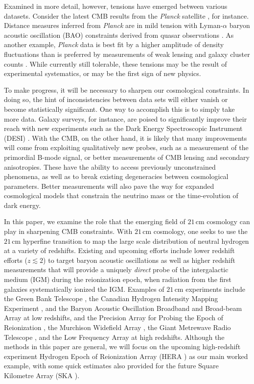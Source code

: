\documentclass[twocolumn,aps,prd,nofootinbib,showpacs,superscriptaddress]{revtex4-1}
\begin{document}
Examined in more detail, however, tensions have emerged between various datasets. Consider the latest CMB results from the \emph{Planck} satellite \cite{Planck2015overview}, for instance. Distance measures inferred from \emph{Planck} are in mild tension with Lyman-$\alpha$ baryon acoustic oscillation (BAO) constraints derived from quasar observations \cite{Planck2015parameters}. As another example, \emph{Planck} data is best fit by a higher amplitude of density fluctuations than is preferred by measurements of weak lensing and galaxy cluster counts \cite{Planck2015clusters}. While currently still tolerable, these tensions may be the result of experimental systematics, or may be the first sign of new physics.

To make progress, it will be necessary to sharpen our cosmological constraints. In doing so, the hint of inconsistencies between data sets will either vanish or become statistically significant. One way to accomplish this is to simply take more data. Galaxy surveys, for instance, are poised to significantly improve their reach with new experiments such as the Dark Energy Spectroscopic Instrument (DESI) \cite{levi_et_al2013}. With the CMB, on the other hand, it is likely that many improvements will come from exploiting qualitatively new probes, such as a measurement of the primordial B-mode signal, or better measurements of CMB lensing and secondary anisotropies. These have the ability to access previously unconstrained phenomena, as well as to break existing degeneracies between cosmological parameters. Better measurements will also pave the way for expanded cosmological models that constrain the neutrino mass or the time-evolution of dark energy.

In this paper, we examine the role that the emerging field of $21\,\textrm{cm}$ cosmology can play in sharpening CMB constraints. With $21\,\textrm{cm}$ cosmology, one seeks to use the $21\,\textrm{cm}$ hyperfine transition to map the large scale distribution of neutral hydrogen at a variety of redshifts. Existing and upcoming efforts include lower redshift efforts ($z \lesssim 2$) to target baryon acoustic oscillations as well as higher redshift measurements that will provide a uniquely \emph{direct} probe of the intergalactic medium (IGM) during the reionization epoch, when radiation from the first galaxies systematically ionized the IGM. Examples of $21\,\textrm{cm}$ experiments include the Green Bank Telescope \cite{masui_et_al2013,switzer_et_al2013}, the Canadian Hydrogen Intensity Mapping Experiment \cite{shaw_et_al2014a}, and the Baryon Acoustic Oscillation Broadband and Broad-beam Array \cite{pober_et_al2013} at low redshifts, and the Precision Array for Probing the Epoch of Reionization \cite{parsons_et_al2010}, the Murchison Widefield Array \cite{tingay_et_al2013,bowman_et_al2012}, the Giant Metrewave Radio Telescope \cite{paciga_et_al2013}, and the Low Frequency Array \cite{van_haarlem_et_al2013} at high redshifts. Although the methods in this paper are general, we will focus on the upcoming high-redshift experiment Hydrogen Epoch of Reionization Array (HERA \cite{pober_et_al2014}) as our main worked example, with some quick estimates also provided for the future Square Kilometre Array (SKA \cite{mellema_et_al2013}).
\end{document}
